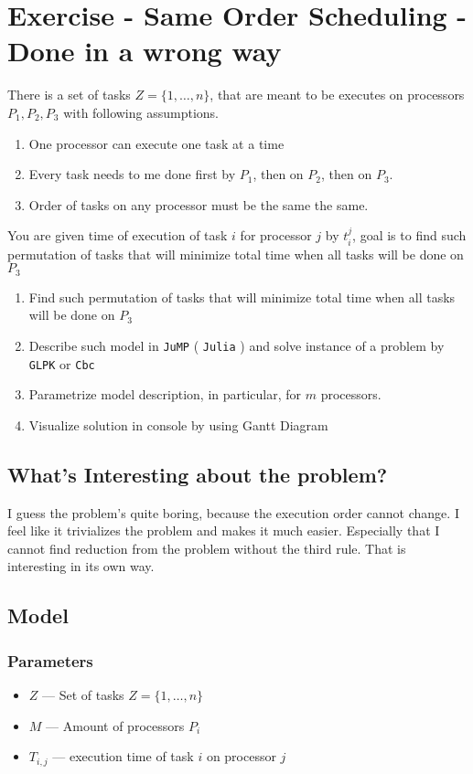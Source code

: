 \section{Exercise - Same Order Scheduling - Done in a wrong way}
There is a set of tasks $Z = \{1, \dots , n\}$, 
that are meant to be executes on processors $P_1, P_2, P_3$ with following assumptions.
\begin{enumerate}
    \item One processor can execute one task at a time
    \item Every task needs to me done first by $P_1$, then on $P_2$, then on $P_3$.
    \item Order of tasks on any processor must be the same the same.
\end{enumerate}
You are given time of execution of task $i$ for processor $j$ by $t^j_i$,
goal is to find such permutation of tasks that will minimize total time when all tasks will be done on $P_3$
\begin{enumerate}
    \item Find such permutation of tasks that will minimize total time when all tasks will be done on $P_3$ \notdone
    \item Describe such model in \texttt{JuMP} ( \texttt{Julia} ) and solve instance of a problem by \texttt{GLPK} or \texttt{Cbc} \notdone
    \item Parametrize model description, in particular, for $m$ processors. \notdone  
    \item Visualize solution in console by using Gantt Diagram \notdone
\end{enumerate}

\subsection{What's Interesting about the problem?}
I guess the problem's quite boring, because the execution order cannot change. I feel like it trivializes the problem and makes it much easier. 
Especially that I cannot find reduction from the problem without the third rule. That is interesting in its own way.

\subsection{Model}
\subsubsection*{Parameters}
\begin{itemize}
    \item $Z$ --- Set of tasks $Z = \{1, \dots , n\}$
    \item $M$ --- Amount of processors $P_i$
    \item $T_{i, j}$ --- execution time of task $i$ on processor $j$
\end{itemize}
